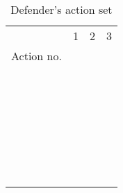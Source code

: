 \documentclass{acm_proc_article-sp}
\begin{document}
\newcommand{\Rowna}{\stepcounter{Rownumbera}\theRownumbera}
\renewcommand{\multirowsetup}{\centering}
\begin{table}[htpb]
\scriptsize
\centering
\begin{tabular}{cccc}\hline
  &  1      &  2       & 3         \\
Action no.             &         &          &           \\\hline
\Rowna                 &   &    &     \\
\Rowna                 &   &    &     \\
\Rowna                 &   &  &   \\
                       &    &    &   \\
\Rowna                 &   &       &   \\
                       &  &   &  \\
\Rowna                 &   &    &   \\
                       &   &  &    \\
\Rowna                 &   &    &   \\
                       &   &  &  \\
\Rowna                 &   &       &   \\
                       &   &   &   \\
\Rowna                 &   &       &   \\
\Rowna                 &   &       &   \\
                       &   &     &   \\
\Rowna                 &   &       &    \\
                       &   &   &   \\
\Rowna                 &   &       &   \\
                       &   &   &   \\
\Rowna                 &   &       &   \\
                       &   &    &   \\
\Rowna                 &   &       &   \\
\Rowna                 &   &       &   \\
                       &  &  &  \\
\Rowna                 &   &       &   \\
\Rowna                 &   &       &   \\
                       &   & & \\
\Rowna                 &   &       &   \\
\Rowna                 &   &       &   \\
\hline
\end{tabular}
\caption{\label{defenderaction} Defender's action set}
\end{table}
\end{document}
